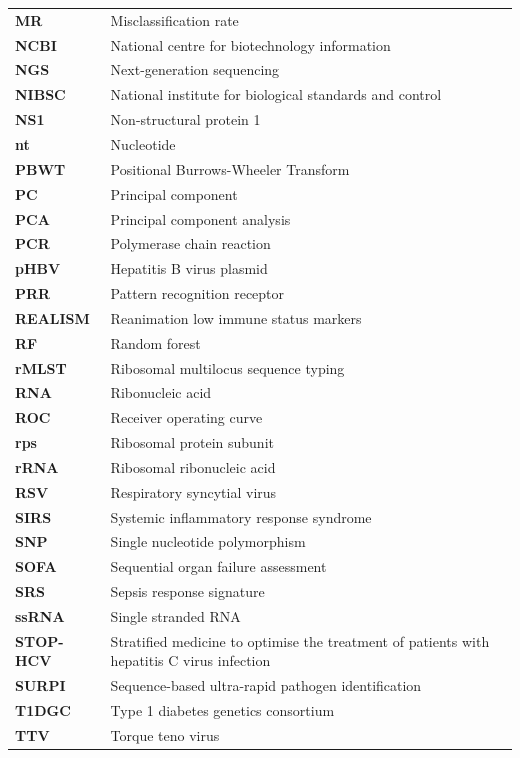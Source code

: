 \begin{longtable}[l]{l l}
		\textbf{MR} & Misclassification rate\\
		\textbf{NCBI} & National centre for biotechnology information\\
		\textbf{NGS} & Next-generation sequencing\\
		\textbf{NIBSC} & National institute for biological standards and control\\
		\textbf{NS1} & Non-structural protein 1\\
		\textbf{nt} & Nucleotide\\
		\textbf{PBWT} & Positional Burrows-Wheeler Transform\\
		\textbf{PC} & Principal component\\
		\textbf{PCA} & Principal component analysis\\
		\textbf{PCR} & Polymerase chain reaction\\
		\textbf{pHBV} & Hepatitis B virus plasmid\\
		\textbf{PRR} & Pattern recognition receptor\\
		\textbf{REALISM} & Reanimation low immune status markers\\
		\textbf{RF} & Random forest\\
		\textbf{rMLST} & Ribosomal multilocus sequence typing\\
		\textbf{RNA} & Ribonucleic acid\\
		\textbf{ROC} & Receiver operating curve\\
		\textbf{rps} & Ribosomal protein subunit\\
		\textbf{rRNA} & Ribosomal ribonucleic acid\\
		\textbf{RSV} & Respiratory syncytial virus\\
		\textbf{SIRS} & Systemic inflammatory response syndrome\\
		\textbf{SNP} & Single nucleotide polymorphism\\
		\textbf{SOFA} & Sequential organ failure assessment\\
		\textbf{SRS} & Sepsis response signature\\
		\textbf{ssRNA} & Single stranded RNA\\
		\textbf{STOP-HCV} & Stratified medicine to optimise the treatment of patients with hepatitis C virus infection\\
		\textbf{SURPI} & Sequence-based ultra-rapid pathogen identification\\
		\textbf{T1DGC} & Type 1 diabetes genetics consortium\\
		\textbf{TTV} & Torque teno virus\\

\end{longtable}
